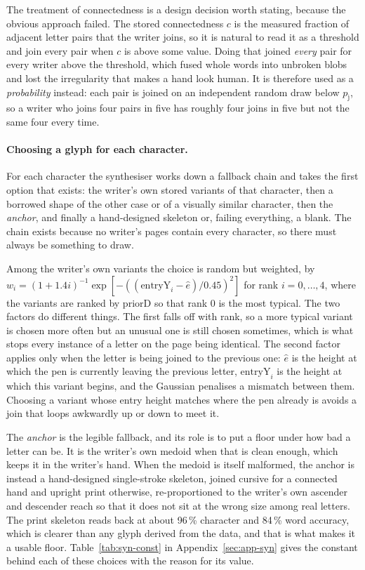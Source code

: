 The treatment of connectedness is a design decision worth stating, because the obvious approach failed. The stored connectedness $c$ is the measured fraction of adjacent letter pairs that the writer joins, so it is natural to read it as a threshold and join every pair when $c$ is above some value. Doing that joined \emph{every} pair for every writer above the threshold, which fused whole words into unbroken blobs and lost the irregularity that makes a hand look human. It is therefore used as a \emph{probability} instead: each pair is joined on an independent random draw below $p_{\mathrm j}$, so a writer who joins four pairs in five has roughly four joins in five but not the same four every time.

\paragraph{Choosing a glyph for each character.}
For each character the synthesiser works down a fallback chain and takes the first option that exists: the writer's own stored variants of that character, then a borrowed shape of the other case or of a visually similar character, then the \emph{anchor}, and finally a hand-designed skeleton or, failing everything, a blank. The chain exists because no writer's pages contain every character, so there must always be something to draw.

Among the writer's own variants the choice is random but weighted, by $w_i=(1+1.4i)^{-1}\exp[-((\mathrm{entryY}_i-\hat e)/0.45)^2]$ for rank $i=0,\ldots,4$, where the variants are ranked by $\mathrm{priorD}$ so that rank 0 is the most typical. The two factors do different things. The first falls off with rank, so a more typical variant is chosen more often but an unusual one is still chosen sometimes, which is what stops every instance of a letter on the page being identical. The second factor applies only when the letter is being joined to the previous one: $\hat e$ is the height at which the pen is currently leaving the previous letter, $\mathrm{entryY}_i$ is the height at which this variant begins, and the Gaussian penalises a mismatch between them. Choosing a variant whose entry height matches where the pen already is avoids a join that loops awkwardly up or down to meet it.

The \emph{anchor} is the legible fallback, and its role is to put a floor under how bad a letter can be. It is the writer's own medoid when that is clean enough, which keeps it in the writer's hand. When the medoid is itself malformed, the anchor is instead a hand-designed single-stroke skeleton, joined cursive for a connected hand and upright print otherwise, re-proportioned to the writer's own ascender and descender reach so that it does not sit at the wrong size among real letters. The print skeleton reads back at about 96\,\% character and 84\,\% word accuracy, which is clearer than any glyph derived from the data, and that is what makes it a usable floor. Table~\ref{tab:syn-const} in Appendix~\ref{sec:app-syn} gives the constant behind each of these choices with the reason for its value.


